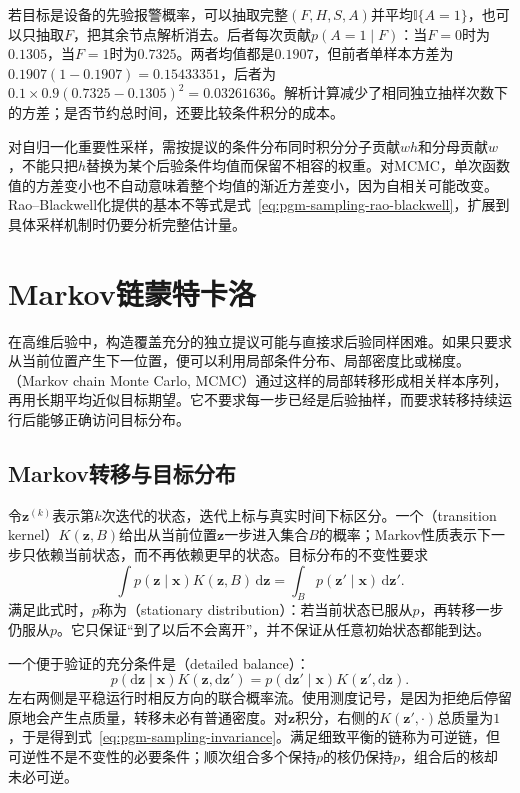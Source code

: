 若目标是设备的先验报警概率，可以抽取完整$(F,H,S,A)$并平均$\mathbb{I}\{A=1\}$，也可以只抽取$F$，把其余节点解析消去。后者每次贡献$p(A=1\mid F)$：当$F=0$时为$0.1305$，当$F=1$时为$0.7325$。两者均值都是$0.1907$，但前者单样本方差为$0.1907(1-0.1907)=0.15433351$，后者为$0.1\times0.9(0.7325-0.1305)^2=0.03261636$。解析计算减少了相同独立抽样次数下的方差；是否节约总时间，还要比较条件积分的成本。

对自归一化重要性采样，需按提议的条件分布同时积分分子贡献$wh$和分母贡献$w$，不能只把$h$替换为某个后验条件均值而保留不相容的权重。对MCMC，单次函数值的方差变小也不自动意味着整个均值的渐近方差变小，因为自相关可能改变。Rao--Blackwell化提供的基本不等式是式~\eqref{eq:pgm-sampling-rao-blackwell}，扩展到具体采样机制时仍要分析完整估计量。

\section{Markov链蒙特卡洛}
\label{sec:pgm-sampling-mcmc}

在高维后验中，构造覆盖充分的独立提议可能与直接求后验同样困难。如果只要求从当前位置产生下一位置，便可以利用局部条件分布、局部密度比或梯度。（Markov chain Monte Carlo, MCMC）通过这样的局部转移形成相关样本序列，再用长期平均近似目标期望。它不要求每一步已经是后验抽样，而要求转移持续运行后能够正确访问目标分布。

\subsection{Markov转移与目标分布}
\label{sec:pgm-sampling-markov-kernel}

令$\bm{z}^{(k)}$表示第$k$次迭代的状态，迭代上标与真实时间下标区分。一个（transition kernel）$K(\bm{z},B)$给出从当前位置$\bm{z}$一步进入集合$B$的概率；Markov性质表示下一步只依赖当前状态，而不再依赖更早的状态。目标分布的不变性要求
\begin{equation}
  \int p(\bm{z}\mid\bm{x})K(\bm{z},B)\,\mathrm{d}\bm{z}
    =\int_B p(\bm{z}'\mid\bm{x})\,\mathrm{d}\bm{z}'.
  \label{eq:pgm-sampling-invariance}
\end{equation}
满足此式时，$p$称为（stationary distribution）：若当前状态已服从$p$，再转移一步仍服从$p$。它只保证“到了以后不会离开”，并不保证从任意初始状态都能到达。

一个便于验证的充分条件是（detailed balance）：
\begin{equation}
  p(\mathrm{d}\bm{z}\mid\bm{x})K(\bm{z},\mathrm{d}\bm{z}')
    =p(\mathrm{d}\bm{z}'\mid\bm{x})K(\bm{z}',\mathrm{d}\bm{z}).
  \label{eq:pgm-sampling-detailed-balance}
\end{equation}
左右两侧是平稳运行时相反方向的联合概率流。使用测度记号，是因为拒绝后停留原地会产生点质量，转移未必有普通密度。对$\bm{z}$积分，右侧的$K(\bm{z}',\cdot)$总质量为$1$，于是得到式~\eqref{eq:pgm-sampling-invariance}。满足细致平衡的链称为可逆链，但可逆性不是不变性的必要条件；顺次组合多个保持$p$的核仍保持$p$，组合后的核却未必可逆。

